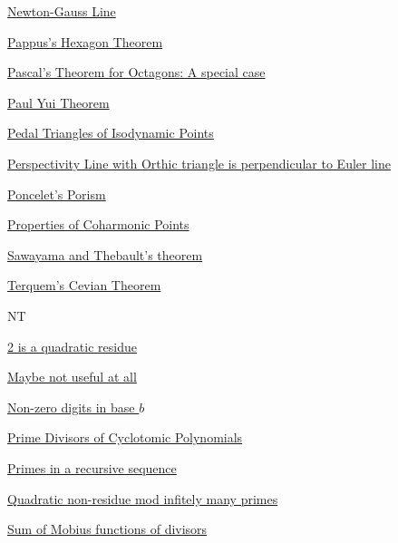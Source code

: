 \hyperref  [theorem:Newton-Gauss Line]{Newton-Gauss Line}

\hyperref  [theorem:Pappus's Hexagon Theorem]{Pappus's Hexagon Theorem}

\hyperref  [theorem:Pascal's Theorem for Octagons: A special case]{Pascal's Theorem for Octagons: A special case}

\hyperref  [theorem:Paul Yui Theorem]{Paul Yui Theorem}

\hyperref  [theorem:Pedal Triangles of Isodynamic Points]{Pedal Triangles of Isodynamic Points}

\hyperref  [theorem:Perspectivity Line with Orthic triangle is perpendicular to Euler line]{Perspectivity Line with Orthic triangle is perpendicular to Euler line}

\hyperref  [theorem:Poncelet's Porism]{Poncelet's Porism}

\hyperref  [theorem:Properties of Coharmonic Points]{Properties of Coharmonic Points}

\hyperref  [theorem:Sawayama and Thebault's theorem]{Sawayama and Thebault's theorem}

\hyperref  [theorem:Terquem's Cevian Theorem]{Terquem's Cevian Theorem}




\newpage NT


\hyperref  [lemma:2 is a quadratic residue]{2 is a quadratic residue}

\hyperref  [lemma:]{}

\hyperref  [lemma:]{}

\hyperref  [lemma:]{}

\hyperref  [lemma:]{}

\hyperref  [lemma:Maybe not useful at all]{Maybe not useful at all}

\hyperref  [lemma:Non-zero digits in base $ b $]{Non-zero digits in base $ b $}

\hyperref  [lemma:Prime Divisors of Cyclotomic Polynomials]{Prime Divisors of Cyclotomic Polynomials}

\hyperref  [lemma:Primes in a recursive sequence]{Primes in a recursive sequence}

\hyperref  [lemma:Quadratic non-residue mod infitely many primes]{Quadratic non-residue mod infitely many primes}

\hyperref  [lemma:Sum of Mobius functions of divisors]{Sum of Mobius functions of divisors}

\hyperref  [theorem:]{}

\hyperref  [theorem:]{}

